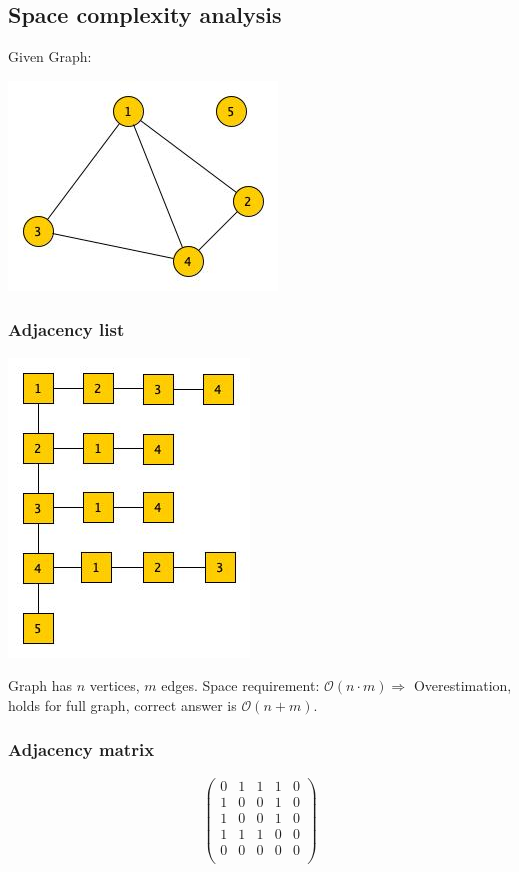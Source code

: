 \subsection{Space complexity analysis}
Given Graph:
\begin{center}
	\includegraphics[scale=0.5]{img/graph1}
\end{center}

\subsubsection{Adjacency list}
\begin{center}
	\includegraphics[scale=0.5]{img/adjL1}
\end{center}

Graph has $n$ vertices, $m$ edges. Space requirement: $\mathcal{O}(n \cdot m) \Rightarrow $ Overestimation, holds for full graph, correct answer is $\mathcal{O}(n + m)$.

\subsubsection{Adjacency matrix}

$$\begin{pmatrix}
0 & 1 & 1 & 1 & 0 \\
1 & 0 & 0 & 1 & 0 \\
1 & 0 & 0 & 1 & 0 \\
1 & 1 & 1 & 0 & 0 \\
0 & 0 & 0 & 0 & 0 \\
\end{pmatrix}$$

